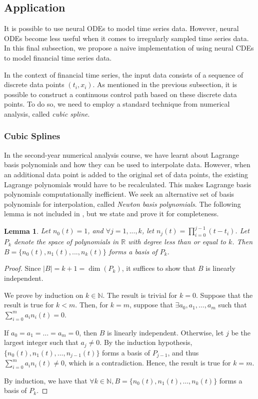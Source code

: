 \documentclass[a4paper,11pt,titlepage]{article}
\theoremstyle{definition}
\theoremstyle{plain}
\newtheorem{lemma}[theorem]{Lemma}
\theoremstyle{remark}
\begin{document}
\subsection{Application}

It is possible to use neural ODEs to model time series data. However, neural ODEs become less useful when it comes to irregularly sampled time series data. In this final subsection, we propose a naive implementation of using neural CDEs to model financial time series data.

In the context of financial time series, the input data consists of a sequence of discrete data points $\left(t_i,x_i\right)$. As mentioned in the previous subsection, it is possible to construct a continuous control path based on these discrete data points. To do so, we need to employ a standard technique from numerical analysis, called \textit{cubic spline}. 

\subsubsection{Cubic Splines}

In the second-year numerical analysis course, we have learnt about Lagrange basis polynomials and how they can be used to interpolate data. However, when an additional data point is added to the original set of data points, the existing Lagrange polynomials would have to be recalculated. This makes Lagrange basis polynomials computationally inefficient. We seek an alternative set of basis polynomials for interpolation, called \textit{Newton basis polynomials}. The following lemma is not included in \cite{Gautschi2012}, but we state and prove it for completeness.

\begin{lemma}
    Let $n_0(t)=1$, and $\forall j=1,...,k$, let $n_j(t)=\prod_{i=0}^{j-1}(t-t_i)$. Let $P_k$ denote the space of polynomials in $\mathbb{R}$ with  degree less than or equal to $k$. Then $B=\{n_0(t),n_1(t),...,n_k(t)\}$ forms a basis of $P_k$.
\end{lemma}

\begin{proof}
    Since $|B|=k+1=\dim(P_k)$, it suffices to show that $B$ is linearly independent.
    
    We prove by induction on $k\in\mathbb{N}$. The result is trivial for $k=0$. Suppose that the result is true for $k<m$. Then, for $k=m$, suppose that $\exists a_0,a_1,\dots,a_m$ such that $\sum_{i=0}^ma_in_i(t)=0$.

    If $a_0=a_1=\dots=a_m=0$, then $B$ is linearly independent. Otherwise, let $j$ be the largest integer such that $a_j\neq0$. By the induction hypothesis, $\{n_0(t),n_1(t),\dots,n_{j-1}(t)\}$ forms a basis of $P_{j-1}$, and thus $\sum_{i=0}^ma_in_i(t)\neq0$, which is a contradiction. Hence, the result is true for $k=m$.

    By induction, we have that $\forall k\in\mathbb{N}, B=\{n_0(t),n_1(t),\dots,n_k(t)\}$ forms a basis of $P_k$.
\end{proof}
\end{document}

